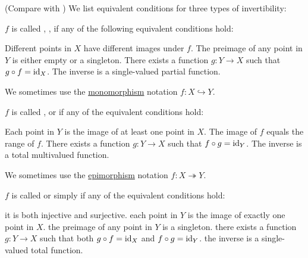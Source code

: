 \begin{definition}\label{def:function_invertibility}(Compare with )
  We list equivalent conditions for three types of invertibility:
  \begin{thmenum}
     \( f \) is called , ,  if any of the following equivalent conditions hold:
    \begin{thmenum}
       Different points in \( X \) have different images under \( f \).
       The preimage of any point in \( Y \) is either empty or a singleton.
       There exists a function \( g: Y \to X \) such that \( g \circ f = \operatorname{id}_X \).
       The inverse is a single-valued partial function.
    \end{thmenum}

    We sometimes use the \hyperref[def:morphism_invertibility/monomorphism]{monomorphism} notation \( f: X \hookrightarrow Y \).

     \( f \) is called ,  or  if any of the equivalent conditions hold:
    \begin{thmenum}
       Each point in \( Y \) is the image of at least one point in \( X \).
       The image of \( f \) equals the range of \( f \).
       There exists a function \( g: Y \to X \) such that \( f \circ g = \operatorname{id}_Y \).
       The inverse is a total multivalued function.
    \end{thmenum}

    We sometimes use the \hyperref[def:morphism_invertibility/epimorphism]{epimorphism} notation \( f: X \twoheadrightarrow Y \).

     \( f \) is called  or simply  if any of the equivalent conditions hold:
    \begin{thmenum}
       it is both injective and surjective.
       each point in \( Y \) is the image of exactly one point in \( X \).
       the preimage of any point in \( Y \) is a singleton.
       there exists a function \( g: Y \to X \) such that both \( g \circ f = \operatorname{id}_X \) and \( f \circ g = \operatorname{id}_Y \).
       the inverse is a single-valued total function.
    \end{thmenum}


\end{thmenum}
\end{definition}
